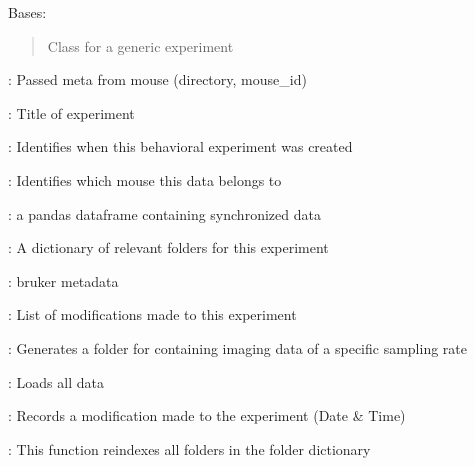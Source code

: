\documentclass[letterpaper,10pt,english]{sphinxmanual}
\begin{document}
\begin{fulllineitems}
\label{\detokenize{Organization:Organization.Experiment}}
\pysigstartsignatures
{}
\pysigstopsignatures
\sphinxAtStartPar
Bases: 
\begin{quote}

\sphinxAtStartPar
Class for a generic experiment
\end{quote}
\begin{description}
\begin{DUlineblock}{0em}
\item[]  : Passed meta from mouse (directory, mouse\_id)
\item[]  : Title of experiment
\end{DUlineblock}

\begin{DUlineblock}{0em}
\item[]  : Identifies when this behavioral experiment was created
\item[]  : Identifies which mouse this data belongs to
\end{DUlineblock}

\begin{DUlineblock}{0em}
\item[]  : a pandas dataframe containing synchronized data
\item[]  : A dictionary of relevant folders for this experiment
\item[]  : bruker metadata
\item[]  : List of modifications made to this experiment
\end{DUlineblock}

\begin{DUlineblock}{0em}
\item[]  : Generates a folder for containing imaging data of a specific sampling rate
\item[]  : Loads all data
\item[]  :  Records a modification made to the experiment (Date \& Time)
\item[]  : This function re\sphinxhyphen{}indexes all folders in the folder dictionary
\end{DUlineblock}


\end{description}
\end{fulllineitems}
\end{document}
